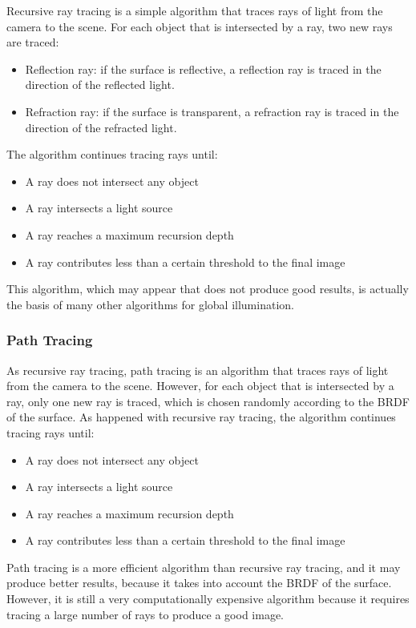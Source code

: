 Recursive ray tracing is a simple algorithm that traces rays of light from the camera to the scene. For each object that is intersected by a ray, two new rays are traced:
\begin{itemize}
    \item Reflection ray: if the surface is reflective, a reflection ray is traced in the direction of the reflected light.
    \item Refraction ray: if the surface is transparent, a refraction ray is traced in the direction of the refracted light.
\end{itemize}

The algorithm continues tracing rays until:
\begin{itemize}
    \item A ray does not intersect any object
    \item A ray intersects a light source
    \item A ray reaches a maximum recursion depth
    \item A ray contributes less than a certain threshold to the final image
\end{itemize}

This algorithm, which may appear that does not produce good results, is actually the basis of many other algorithms for global illumination.

\subsubsection{Path Tracing}

As recursive ray tracing, path tracing is an algorithm that traces rays of light from the camera to the scene. However, for each object that is intersected by a ray, only one new ray is traced, which is chosen randomly according to the BRDF of the surface. As happened with recursive ray tracing, the algorithm continues tracing rays until:
\begin{itemize}
    \item A ray does not intersect any object
    \item A ray intersects a light source
    \item A ray reaches a maximum recursion depth
    \item A ray contributes less than a certain threshold to the final image
\end{itemize}

Path tracing is a more efficient algorithm than recursive ray tracing, and it may produce better results, because it takes into account the BRDF of the surface. However, it is still a very computationally expensive algorithm because it requires tracing a large number of rays to produce a good image.